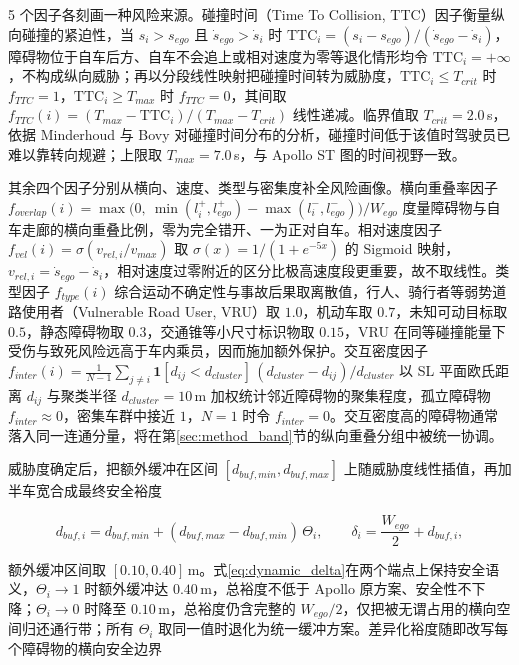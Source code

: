 \documentclass[a4paper,zihao=5]{ctexart}
\theoremstyle{definition}
\begin{document}
5 个因子各刻画一种风险来源。碰撞时间（Time To Collision, TTC）因子衡量纵向碰撞的紧迫性，当 $s_i > s_{ego}$ 且 $\dot{s}_{ego} > \dot{s}_i$ 时 $\mathrm{TTC}_i = (s_i - s_{ego})/(\dot{s}_{ego} - \dot{s}_i)$，障碍物位于自车后方、自车不会追上或相对速度为零等退化情形均令 $\mathrm{TTC}_i=+\infty$，不构成纵向威胁；再以分段线性映射把碰撞时间转为威胁度，$\mathrm{TTC}_i \leq T_{crit}$ 时 $f_{TTC}=1$，$\mathrm{TTC}_i \geq T_{max}$ 时 $f_{TTC}=0$，其间取 $f_{TTC}(i) = (T_{max} - \mathrm{TTC}_i)/(T_{max} - T_{crit})$ 线性递减。临界值取 $T_{crit}=2.0$\,s，依据 Minderhoud 与 Bovy 对碰撞时间分布的分析\citep{minderhoud2001extended}，碰撞时间低于该值时驾驶员已难以靠转向规避；上限取 $T_{max}=7.0$\,s，与 Apollo ST 图的时间视野一致。

其余四个因子分别从横向、速度、类型与密集度补全风险画像。横向重叠率因子 $f_{overlap}(i)=\max\!\big(0,\ \min(l_i^{+}, l_{ego}^{+}) - \max(l_i^{-}, l_{ego}^{-})\big)/W_{ego}$ 度量障碍物与自车走廊的横向重叠比例，零为完全错开、一为正对自车。相对速度因子 $f_{vel}(i)=\sigma(v_{rel,i}/v_{max})$ 取 $\sigma(x)=1/(1+e^{-5x})$ 的 Sigmoid 映射，$v_{rel,i}=\dot{s}_{ego}-\dot{s}_i$，相对速度过零附近的区分比极高速度段更重要，故不取线性。类型因子 $f_{type}(i)$ 综合运动不确定性与事故后果取离散值，行人、骑行者等弱势道路使用者（Vulnerable Road User, VRU）取 $1.0$，机动车取 $0.7$，未知可动目标取 $0.5$，静态障碍物取 $0.3$，交通锥等小尺寸标识物取 $0.15$，VRU 在同等碰撞能量下受伤与致死风险远高于车内乘员，因而施加额外保护。交互密度因子 $f_{inter}(i) = \frac{1}{N-1} \sum_{j \neq i} \mathbf{1}[d_{ij} < d_{cluster}] \,(d_{cluster} - d_{ij})/d_{cluster}$ 以 SL 平面欧氏距离 $d_{ij}$ 与聚类半径 $d_{cluster}=10$\,m 加权统计邻近障碍物的聚集程度，孤立障碍物 $f_{inter}\approx 0$，密集车群中接近 $1$，$N=1$ 时令 $f_{inter}=0$。交互密度高的障碍物通常落入同一连通分量，将在第\ref{sec:method_band}节的纵向重叠分组中被统一协调。

威胁度确定后，把额外缓冲在区间 $[d_{buf,min}, d_{buf,max}]$ 上随威胁度线性插值，再加半车宽合成最终安全裕度

\begin{equation}
    d_{buf,i} = d_{buf,min} + (d_{buf,max} - d_{buf,min})\,\Theta_i, \qquad
    \delta_i = \frac{W_{ego}}{2} + d_{buf,i},
    \label{eq:dynamic_delta}
\end{equation}

额外缓冲区间取 $[0.10, 0.40]$\,m。式\eqref{eq:dynamic_delta}在两个端点上保持安全语义，$\Theta_i \to 1$ 时额外缓冲达 $0.40$\,m，总裕度不低于 Apollo 原方案、安全性不下降；$\Theta_i \to 0$ 时降至 $0.10$\,m，总裕度仍含完整的 $W_{ego}/2$，仅把被无谓占用的横向空间归还通行带；所有 $\Theta_i$ 取同一值时退化为统一缓冲方案。差异化裕度随即改写每个障碍物的横向安全边界
\end{document}
